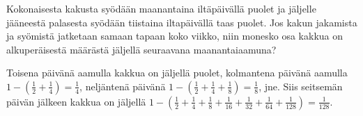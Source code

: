 \begin{tehtava}
Kokonaisesta kakusta syödään maanantaina iltäpäivällä puolet ja jäljelle jääneestä palasesta syödään tiistaina 	iltapäivällä taas puolet. Jos kakun jakamista ja syömistä jatketaan samaan tapaan koko viikko, niin monesko 
osa kakkua on alkuperäisestä määrästä jäljellä seuraavana maanantaiaamuna?
\begin{vastaus}
Toisena päivänä aamulla kakkua on jäljellä puolet, kolmantena päivänä aamulla $1-(\frac{1}{2}+\frac{1}{4})=\frac{1}{4}$, 
neljäntenä päivänä $1-(\frac{1}{2}+\frac{1}{4}+\frac{1}{8})=\frac{1}{8}$, jne. Siis seitsemän päivän jälkeen kakkua 
on jäljellä $1-(\frac{1}{2}+\frac{1}{4}+\frac{1}{8}+\frac{1}{16}+\frac{1}{32}+\frac{1}{64}+\frac{1}{128})=\frac{1}{128}$.  
\end{vastaus}
\end{tehtava}

